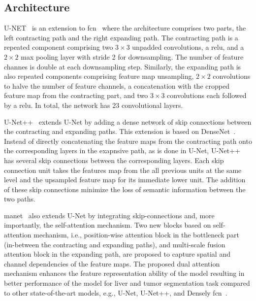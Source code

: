 \documentclass[mathematics,article,submit,pdftex,moreauthors]{Definitions/mdpi}
\begin{document}
\subsection{Architecture}
U-NET~\cite{Ronneberger2015} is an extension to
 \ac{fcn}~\cite{Long2015} where the architecture
 comprises two parts, the left contracting path
 and the right expanding path. The contracting
 path is a repeated component comprising two $3\times 3$
 unpadded convolutions, a \ac{relu}, and a $2\times 2 $ max
 pooling layer with stride 2 for downsampling. The
 number of feature channes is double at each downsampling
 step. Similarly, the expanding path is also 
 repeated components comprising feature map unsampling,
 $2\times 2$ convolutions to halve the number of feature channels, 
 a concatenation with the cropped feature map from
 the contracting part, and two $3\times 3$ convolutions
 each followed by a \ac{relu}. In total, the network
 has 23 convolutional layers.

U-Net++~\cite{Zhou2018} extends U-Net by adding a dense
network of skip connections between the contracting
and expanding paths. This extension is based on 
DenseNet~\cite{Huang2017}. Instead of directly concatenating
the feature maps from the contracting path onto the corresponding
layers in the exapnsive path, as is done in U-Net, U-Net++
has several skip connections between the corresponding layers.
Each skip connection unit takes the features map from the all
previous units at the same level and the upsampled feature map
for its immediate lower unit. The addition of these
skip connections minimize the loss of semantic information
between the two paths.

\ac{manet}~\cite{Fan2020} also extends U-Net by integrating
skip-connections and, more importantly, the self-attention mechanism.
Two new blocks based on self-attention mechanism, i.e., 
position-wise attention block in the bottleneck
part (in-between the contracting and expanding paths),
and multi-scale fusion attention block in the expanding
path, are proposed to capture spatial and channel
dependencies of the feature maps. The proposed dual
attention mechanism enhances the feature representation ability
of the model resulting in better performance
of the model for liver and tumor segmentation
task compared to other state-of-the-art models,
e.g., U-Net, U-Net++, and Densely \ac{fcn}~\cite{Krishna2018}.
\end{document}
